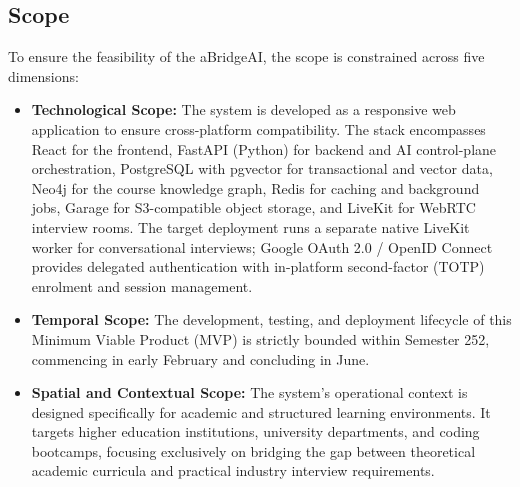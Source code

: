 \subsection{Scope}
\noindent To ensure the feasibility of the aBridgeAI, the scope is constrained across five dimensions:

\begin{itemize}
    \item \textbf{Technological Scope:} The system is developed as a responsive web application to ensure cross-platform compatibility. The stack encompasses React for the frontend, FastAPI (Python) for backend and AI control-plane orchestration, PostgreSQL with pgvector for transactional and vector data, Neo4j for the course knowledge graph, Redis for caching and background jobs, Garage for S3-compatible object storage, and LiveKit for WebRTC interview rooms. The target deployment runs a separate native LiveKit worker for conversational interviews; Google OAuth 2.0 / OpenID Connect provides delegated authentication with in-platform second-factor (TOTP) enrolment and session management.
    
    \item \textbf{Temporal Scope:} The development, testing, and deployment lifecycle of this Minimum Viable Product (MVP) is strictly bounded within Semester 252, commencing in early February and concluding in June.
    
    \item \textbf{Spatial and Contextual Scope:} The system's operational context is designed specifically for academic and structured learning environments. It targets higher education institutions, university departments, and coding bootcamps, focusing exclusively on bridging the gap between theoretical academic curricula and practical industry interview requirements.
    

\end{itemize}
